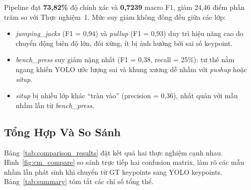 \documentclass[conference]{IEEEtran}
\begin{document}
Pipeline đạt \textbf{73,82\%} độ chính xác và \textbf{0,7239} macro F1, giảm
24,46 điểm phần trăm so với Thực nghiệm~1. Mức suy giảm không đồng đều giữa
các lớp:
\begin{itemize}
  \item \textit{jumping\_jacks} (F1 = 0,94) và \textit{pullup} (F1 = 0,93) duy
        trì hiệu năng cao do chuyển động biên độ lớn, đối xứng, ít bị ảnh hưởng
        bởi sai số keypoint.
  \item \textit{bench\_press} suy giảm nặng nhất (F1 = 0,38, recall = 25\%): tư
        thế nằm ngang khiến YOLO ước lượng sai và khung xương dễ nhầm với
        \textit{pushup} hoặc \textit{situp}.
  \item \textit{situp} bị nhiều lớp khác ``tràn vào'' (precision = 0,36), nhất
        quán với mẫu nhầm lẫn từ \textit{bench\_press}.
\end{itemize}

\subsection{Tổng Hợp Và So Sánh}
\label{sec:comparison}

Bảng~\ref{tab:comparison_results} đặt kết quả hai thực nghiệm cạnh nhau.
Hình~\ref{fig:cm_compare} so sánh trực tiếp hai confusion matrix, làm rõ các
mẫu nhầm lẫn phát sinh khi chuyển từ GT keypoints sang YOLO keypoints.
Bảng~\ref{tab:summary} tóm tắt các chỉ số tổng thể.
\end{document}
